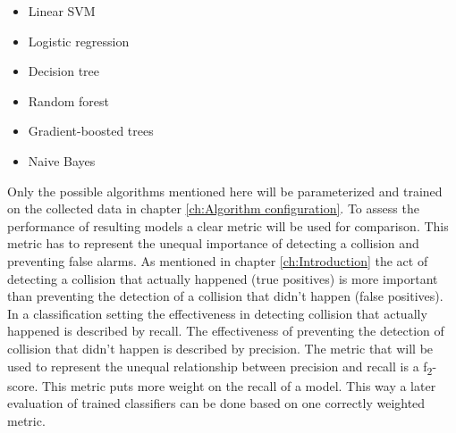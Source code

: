 \begin{itemize}
\item Linear SVM
\item Logistic regression
\item Decision tree
\item Random forest
\item Gradient-boosted trees
\item Naive Bayes
\end{itemize}

Only the possible algorithms mentioned here will be parameterized and trained on the  collected data in chapter \ref{ch:Algorithm configuration}.   \newline
To assess the performance of resulting models a clear metric will be used for comparison. This metric has to represent the unequal importance of detecting a collision and preventing false alarms. As mentioned in chapter \ref{ch:Introduction} the act of detecting a collision that actually happened (true positives) is more important than preventing the detection of a collision that didn't happen (false positives). In a classification setting the effectiveness in detecting collision that actually happened is described by recall. The effectiveness of preventing the detection of collision that didn't happen is described by precision. The metric that will be used to represent the unequal relationship between precision and recall is a f\textsubscript{2}-score. This metric puts more weight on the recall of a model. This way a later evaluation of trained classifiers can be done based on one correctly weighted metric.